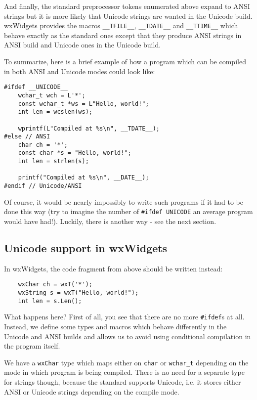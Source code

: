 And finally, the standard preprocessor tokens enumerated above expand to ANSI
strings but it is more likely that Unicode strings are wanted in the Unicode
build. wxWidgets provides the macros {\tt \_\_TFILE\_\_}, {\tt \_\_TDATE\_\_} 
and {\tt \_\_TTIME\_\_} which behave exactly as the standard ones except that
they produce ANSI strings in ANSI build and Unicode ones in the Unicode build.

To summarize, here is a brief example of how a program which can be compiled
in both ANSI and Unicode modes could look like:

\begin{verbatim}
#ifdef __UNICODE__
    wchar_t wch = L'*';
    const wchar_t *ws = L"Hello, world!";
    int len = wcslen(ws);

    wprintf(L"Compiled at %s\n", __TDATE__);
#else // ANSI
    char ch = '*';
    const char *s = "Hello, world!";
    int len = strlen(s);

    printf("Compiled at %s\n", __DATE__);
#endif // Unicode/ANSI
\end{verbatim}

Of course, it would be nearly impossibly to write such programs if it had to
be done this way (try to imagine the number of {\tt \#ifdef UNICODE} an average
program would have had!). Luckily, there is another way - see the next
section.

\subsection{Unicode support in wxWidgets}\label{unicodeinsidewxw}

In wxWidgets, the code fragment from above should be written instead:

\begin{verbatim}
    wxChar ch = wxT('*');
    wxString s = wxT("Hello, world!");
    int len = s.Len();
\end{verbatim}

What happens here? First of all, you see that there are no more {\tt \#ifdef}s
at all. Instead, we define some types and macros which behave differently in
the Unicode and ANSI builds and allows us to avoid using conditional
compilation in the program itself.

We have a {\tt wxChar} type which maps either on {\tt char} or {\tt wchar\_t} 
depending on the mode in which program is being compiled. There is no need for
a separate type for strings though, because the standard 
 supports Unicode, i.e. it stores either ANSI or
Unicode strings depending on the compile mode.

